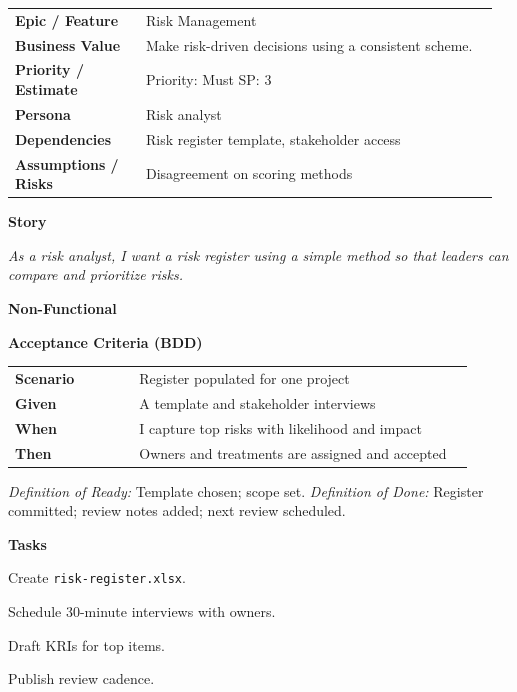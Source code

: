 \documentclass[11pt,letterpaper]{article}
\makeatletter
\newenvironment{kvtable}{%
  \par\noindent\begin{tabular}{@{}>{\raggedright\bfseries\arraybackslash}p{0.26\linewidth} >{\raggedright\arraybackslash}p{0.70\linewidth}@{}}
}{\end{tabular}\par}
\newenvironment{bdd}{%
  \par\noindent\begin{tabular}{@{}>{\raggedright\bfseries\arraybackslash}p{0.26\linewidth} >{\raggedright\arraybackslash}p{0.70\linewidth}@{}}
}{\end{tabular}\par}
\newcommand{\DoRDoD}[2]{%
  \vspace{0.35em}
  {\footnotesize\color{Muted}%
    \textit{Definition of Ready:} #1 \; \textbullet\;
    \textit{Definition of Done:} #2%
  }%
}
\newenvironment{storycard}[2]{%
  \begin{tcolorbox}[cloudcard, title={#1 --- #2}]%
}{\end{tcolorbox}}
\newcommand{\sectionlabel}[1]{\par\vspace{0.35em}\textbf{#1}\par}
\makeatother
\begin{document}
\begin{storycard}{CCS-6}{Ch. 6 — Risk \& Trust Assessment Schemes}
\begin{kvtable}
Epic / Feature & Risk Management\\
Business Value & Make risk-driven decisions using a consistent scheme.\\
Priority / Estimate & Priority: Must \quad SP: 3\\
Persona & Risk analyst\\
Dependencies & Risk register template, stakeholder access\\
Assumptions / Risks & Disagreement on scoring methods\\
\end{kvtable}
\sectionlabel{Story}
\textit{As a risk analyst, I want a risk register using a simple method so that leaders can compare and prioritize risks.}
\sectionlabel{Non-Functional}\;
\sectionlabel{Acceptance Criteria (BDD)}
\begin{bdd}
Scenario & Register populated for one project\\
Given & A template and stakeholder interviews\\
When & I capture top risks with likelihood and impact\\
Then & Owners and treatments are assigned and accepted\\
\end{bdd}
\DoRDoD{Template chosen; scope set.}{Register committed; review notes added; next review scheduled.}
\sectionlabel{Tasks}
\begin{checklist}
\item Create \texttt{risk-register.xlsx}.
\item Schedule 30-minute interviews with owners.
\item Draft KRIs for top items.
\item Publish review cadence.
\end{checklist}
\end{storycard}
\end{document}
